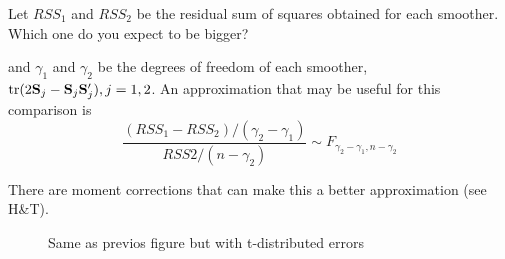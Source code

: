 Let $RSS_1$ and $RSS_2$ be the residual sum of squares obtained for
each smoother. Which one do you expect to be bigger?
 
and $\gamma_1$ and $\gamma_2$ be the degrees of freedom of each
smoother, $\mbox{tr}(2{\mathbf S}_j - {\mathbf S}_j{\mathbf S}_j'), j=1,2$. An approximation that
may be useful for this comparison is
\[
\frac{(RSS_1 - RSS_2)/(\gamma_2 - \gamma_1)}{RSS2/(n-\gamma_2)} \sim
F_{\gamma_2-\gamma_1,n-\gamma_2}
\]

There are moment corrections that can make this a better
approximation (see H\&T).
\begin{figure}[htb]
\caption{Same as previos figure but with t-distributed errors}
\begin{center}
\end{center}
\end{figure}